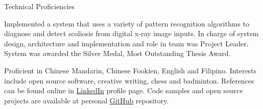 \documentclass[11pt]{article}
\begin{document}
\begin{skillblock}{Technical Proficiencies}
\tinyskip
{}
\tinyskip
{}
\tinyskip
{}
\tinyskip
{}
\end{skillblock}
\shortskip


\begin{longtext}
Implemented a system that uses a variety of pattern recognition algorithms to diagnose and
detect scoliosis from digital x-ray image inputs. In charge
of system design, architecture and implementation and role in team was Project Leader. System was awarded the Silver
Medal, Most Outstanding Thesis Award.\\
\end{longtext}

\shortskip
{}

\begin{longtext}
Proficient in Chinese Mandarin, Chinese Fookien, English and Filipino. Interests include open source software, creative writing, chess and badminton. References can be found online in \href{http://www.linkedin.com/in/waynesee}{LinkedIn} profile page. Code samples and open source projects are available at personal \href{http://github.com/weynsee}{GitHub} repository.
\end{longtext}
\end{document}
